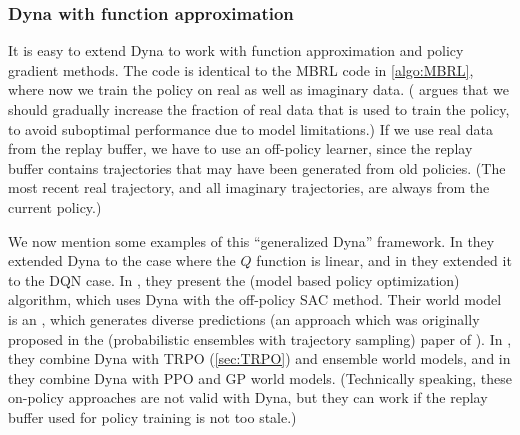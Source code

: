 \subsubsection{Dyna with function approximation}


It is easy to extend Dyna to work with  function approximation
and policy gradient methods.
The code is identical to the MBRL code in \cref{algo:MBRL},
where now we train the policy on real as well as imaginary data.
(\citep{Lai2021} argues that we should gradually increase
the fraction of real data that is used to train the policy,
to avoid suboptimal performance due to model limitations.)
If we use real data from the replay buffer,
we have to use an off-policy learner,
since the replay buffer contains trajectories that may have been
generated from  old policies.
(The most recent real trajectory,
and all imaginary trajectories,
are always  from the current policy.)

We now mention some examples of this ``generalized Dyna'' framework.
In \citep{dynaLinear} they extended Dyna to the case
where the $Q$ function is linear,
and in \citep{Holland2018}
they extended it to the DQN case.
In \citep{Janner2019}, they present the
(model based policy optimization) algorithm,
which uses Dyna with the off-policy SAC method.
Their world model is an
, which generates diverse predictions
(an approach which was originally proposed in
the 
(probabilistic ensembles with trajectory sampling)
paper of \citep{Chua2018}).
In \citep{Kurutach2019}, they combine
Dyna with TRPO (\cref{sec:TRPO}) and ensemble world models,
and 
in \citep{Wu2023dyna} they combine Dyna with PPO and GP world models.
(Technically speaking, these on-policy approaches are not valid with Dyna,
but they can work if the replay buffer  used for policy training
is not too stale.)



